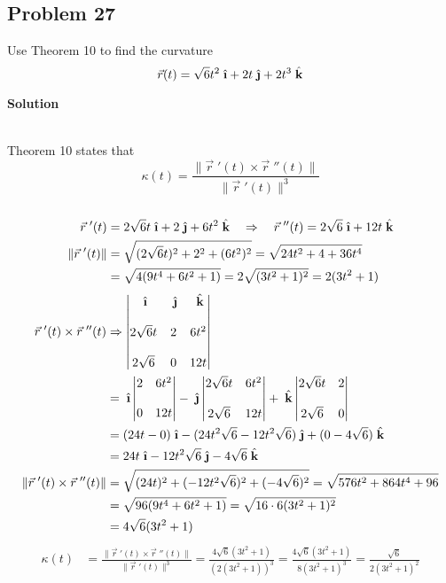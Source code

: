 \documentclass{article}
\newcommand{\ihat}{\;\hat{\textbf{\i}}}
\newcommand{\jhat}{\;\hat{\textbf{\j}}}
\newcommand{\khat}{\;\hat{\textbf{k}}}
\newcommand{\rvec}{\vec{r}(t)}
\newcommand{\drvec}{\vec{r}\;'(t)}
\newcommand\rr{\quad\Rightarrow\quad}
\begin{document}
\subsection*{Problem 27}
Use Theorem 10 to find the curvature
\[
    \rvec = \sqrt{6}t^2\ihat + 2t\jhat + 2t^3\khat
\]
\centerline{\textbf{Solution}} \\
Theorem 10 states that $$\kappa(t) = \frac{\|\drvec \times \vec r \;''(t)\|}{\|\drvec\|^3}$$ \\
\begin{align*}
    \vec r \;'(t) &= 2\sqrt 6t \ihat + 2\jhat + 6t^2\khat \rr \vec r \;''(t) = 2\sqrt 6\ihat + 12t\khat \\
    \|\drvec\| &= \sqrt{(2\sqrt 6t)^2 + 2^2 + (6t^2)^2} = \sqrt{24t^2 + 4 + 36t^4} \\ 
               &= \sqrt{4(9t^4 + 6t^2 + 1)} = 2\sqrt{(3t^2 +1)^2} = 2(3t^2+1)
\end{align*}
\begin{align*}
    \drvec \times \vec r \;''(t)&  \Rightarrow 
\begin{vmatrix}
    \ihat & \jhat & \khat \\
    \\
    2\sqrt 6t & 2 & 6t^2 \\
    \\
    2\sqrt 6 & 0 & 12t
    \end{vmatrix} \\ 
&= \ihat \begin{vmatrix} 2 & 6t^2 \\\\ 0 & 12t \end{vmatrix} - \jhat \begin{vmatrix} 2\sqrt 6t & 6t^2 \\\\ 2\sqrt 6 & 12t \end{vmatrix} + \khat \begin{vmatrix} 2\sqrt 6t & 2 \\\\ 2\sqrt 6 & 0 \end{vmatrix} \\ 
&= (24t - 0)\ihat - (24t^2\sqrt{6} - 12t^2\sqrt{6})\jhat + (0 - 4\sqrt 6)\khat \\ 
&= 24t\ihat - 12t^2\sqrt 6\jhat - 4\sqrt 6\khat \\
    \| \drvec \times \vec r \;''(t) \| &= \sqrt{ (24t)^2 + (-12t^2\sqrt 6)^2 + (-4\sqrt 6)^2} = \sqrt{576t^2 + 864t^4 + 96} \\ 
                                       &= \sqrt{96(9t^4 + 6t^2 + 1)} = \sqrt{16 \cdot 6(3t^2 + 1)^2} \\
                                       &= 4\sqrt 6(3t^2 + 1) \\
\end{align*}
\begin{align*}
    \kappa(t) &= \frac{\|\drvec \times \vec r \;''(t)\|}{\|\drvec\|^3} = \frac{4\sqrt 6(3t^2 + 1)}{(2(3t^2+1))^3} = \frac{4\sqrt 6(3t^2 + 1)}{8(3t^2+1)^3} = \frac{\sqrt 6}{2(3t^2+1)^2}
\end{align*}
                                             
\end{document}
